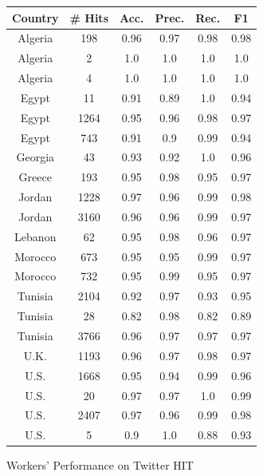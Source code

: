 \documentclass[10pt, a4paper]{article}
\begin{document}
\begin{figure}
\centering
\begin{tabular}{|c|c|c|c|c|c|} \hline 
Country & \# Hits  & Acc. 	& Prec. & Rec. & F1\\ \hline
Algeria & 198 & 0.96 & 0.97 & 0.98 & 0.98 \\ \hline
Algeria & 2 & 1.0 & 1.0 & 1.0 & 1.0 \\ \hline
Algeria & 4 & 1.0 & 1.0 & 1.0 & 1.0 \\ \hline
Egypt & 11 & 0.91 & 0.89 & 1.0 & 0.94 \\ \hline
Egypt & 1264 & 0.95 & 0.96 & 0.98 & 0.97 \\ \hline
Egypt & 743 & 0.91 & 0.9 & 0.99 & 0.94 \\ \hline
Georgia & 43 & 0.93 & 0.92 & 1.0 & 0.96 \\ \hline
Greece & 193 & 0.95 & 0.98 & 0.95 & 0.97 \\ \hline
Jordan & 1228 & 0.97 & 0.96 & 0.99 & 0.98 \\ \hline
Jordan & 3160 & 0.96 & 0.96 & 0.99 & 0.97 \\ \hline
Lebanon & 62 & 0.95 & 0.98 & 0.96 & 0.97 \\ \hline
Morocco & 673 & 0.95 & 0.95 & 0.99 & 0.97 \\ \hline
Morocco & 732 & 0.95 & 0.99 & 0.95 & 0.97 \\ \hline
Tunisia & 2104 & 0.92 & 0.97 & 0.93 & 0.95 \\ \hline
Tunisia & 28 & 0.82 & 0.98 & 0.82 & 0.89 \\ \hline
Tunisia & 3766 & 0.96 & 0.97 & 0.97 & 0.97 \\ \hline
U.K. & 1193 & 0.96 & 0.97 & 0.98 & 0.97 \\ \hline
U.S. & 1668 & 0.95 & 0.94 & 0.99 & 0.96 \\ \hline
U.S. & 20 & 0.97 & 0.97 & 1.0 & 0.99 \\ \hline
U.S. & 2407 & 0.97 & 0.96 & 0.99 & 0.98 \\ \hline
U.S. & 5 & 0.9 & 1.0 & 0.88 & 0.93 \\ \hline
\end{tabular}
\caption{Workers' Performance on Twitter HIT}
\label{fig:performance1}
\end{figure}
\end{document}
